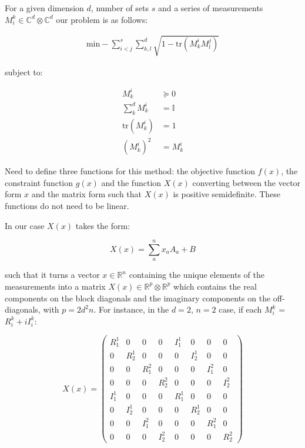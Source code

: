 \documentclass{article}
\begin{document}
For a given dimension $d$, number of sets $s$ and a series of measurements $M_i^k \in \mathbb{C}^d \otimes \mathbb{C}^d$ our problem is as follows:

\begin{align}
	\text{min} -\sum_{i<j}^s \sum_{k,l}^d \sqrt{1-\text{tr}(M_k^i M_l^j)} 
\end{align}

subject to:

\begin{align}
	M_k^i &\succeq 0 \\
	\sum_k^d M_k^i &= \mathbb{I} \\
	\text{tr}(M_k^i) &= 1 \\
	(M_k^i)^2 &= M_k^i
\end{align}

Need to define three functions for this method: the objective function $f(x)$, the constraint function $g(x)$ and the function $X(x)$ converting between the vector form $x$ and the matrix form such that $X(x)$ is positive semidefinite. These functions do not need to be linear.

In our case $X(x)$ takes the form:

\begin{equation}
	X(x) = \sum_a^n x_a A_a + B
\end{equation}

such that it turns a vector $x \in \mathbb{R}^n$ containing the unique elements of the measurements into a matrix $X(x) \in \mathbb{R}^p \otimes \mathbb{R}^p$ which contains the real components on the block diagonals and the imaginary components on the off-diagonals, with $p=2d^2n$. For instance, in the $d=2$, $n=2$ case, if each $M_i^k$ = $R_i^k + iI_i^k$:

\begin{equation}
	X(x) = 
	\begin{pmatrix}
		R_1^1 & 0 & 0 & 0 & I_1^1 & 0 & 0 & 0 \\
		0 & R_2^1 & 0 & 0 & 0 & I_2^1 & 0 & 0 \\
		0 & 0 & R_1^2 & 0 & 0 & 0 & I_1^2 & 0 \\
		0 & 0 & 0 & R_2^2 & 0 & 0 & 0 & I_2^2 \\
		I_1^1 & 0 & 0 & 0 & R_1^1 & 0 & 0 & 0 \\
		0 & I_2^1 & 0 & 0 & 0 & R_2^1 & 0 & 0 \\
		0 & 0 & I_1^2 & 0 & 0 & 0 & R_1^2 & 0 \\
		0 & 0 & 0 & I_2^2 & 0 & 0 & 0 & R_2^2
	\end{pmatrix}
\end{equation}
\end{document}
